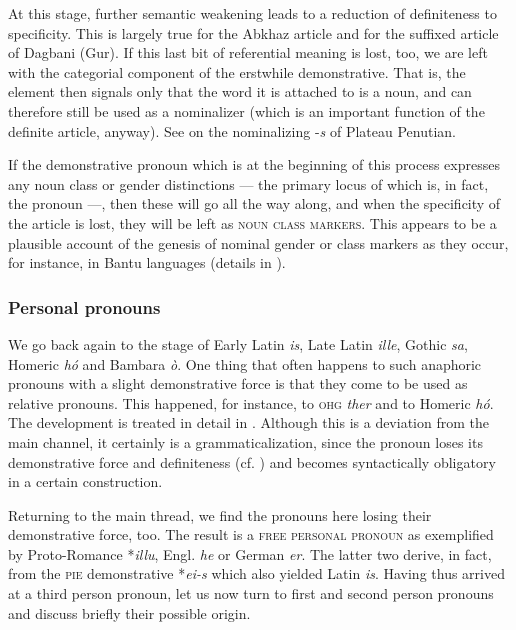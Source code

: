 At this stage, further semantic weakening leads to a reduction of definiteness to specificity. This is largely true for the Abkhaz article and for the suffixed article of Dagbani (Gur). If this last bit of referential meaning is lost, too, we are left with the categorial component of the erstwhile demonstrative. That is, the element then signals only that the word it is attached to is a noun, and can therefore still be used as a nominalizer (which is an important function of the definite article, anyway). See \citet[§3.5]{Greenberg1978} on the nominalizing -\textit{s} of Plateau Penutian.\label{PlateauPenutian}

If the demonstrative pronoun which is at the beginning of this process expresses any noun class or gender distinctions — the primary locus of which is, in fact, the pronoun —, then these will go all the way along, and when the specificity of the article is lost, they will be left as \textsc{noun class markers}. This appears to be a plausible account of the genesis of nominal gender or class markers as they occur, for instance, in Bantu languages (details in \citealt[§7.2]{Lehmann1982b}).

\subsubsection{Personal pronouns} \label{sec:3.2.1.2}
We go back again to the stage of Early Latin \textit{is}, Late Latin \textit{ille}, Gothic \textit{sa}, Homeric \textit{hó} and Bambara \textit{ò}. One thing that often happens to such anaphoric pronouns with a slight demonstrative force is that they come to be used as relative pronouns. This happened, for instance, to \textsc{ohg} \textit{ther} and to Homeric \textit{hó}. The development is treated in detail in \citet[Ch.~\textsc{vi}.1.1.2 and 1.2.2]{Lehmann1984}. Although this is a deviation from the main channel, it certainly is a grammaticalization, since the pronoun loses its demonstrative force and definiteness (cf. \citealt[Ch. \textsc{v}.2.3, §2]{Lehmann1984}) and becomes syntactically obligatory in a certain construction.

Returning to the main thread, we find the pronouns here losing their demonstrative force, too. The result is a \textsc{free personal pronoun} as exemplified by Proto-Romance *\textit{illu}, Engl. \textit{he} or German \textit{er}. The latter two derive, in fact, from the \textsc{pie} demonstrative *\textit{ei-s} which also yielded Latin \textit{is}. Having thus arrived at a third person pronoun, let us now turn to first and second person pronouns and discuss briefly their possible origin.

